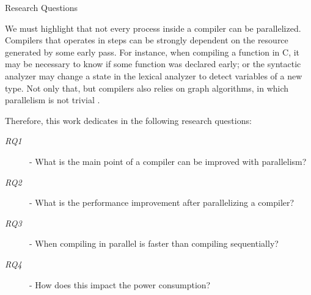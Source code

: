 \begin{section}{Research Questions}


We must highlight that not every process inside a compiler can be parallelized.
Compilers that operates in steps can be strongly dependent on the resource
generated by some early pass.  For instance, when compiling a function in C, it
may be necessary to know if some function was declared early; or the syntactic
analyzer may change a state in the lexical analyzer to detect variables of a
new type. Not only that, but compilers also relies on graph algorithms, in
which parallelism is not trivial \citep{lumsdaine2007challenges}.



Therefore, this work dedicates in the following research questions:

\begin{description}
    \item[\textit{RQ1}] - What is the main point of a compiler can be improved with parallelism?
    \item[\textit{RQ2}] - What is the performance improvement after parallelizing a compiler?
	\item[\textit{RQ3}] - When compiling in parallel is faster than compiling sequentially?
	\item[\textit{RQ4}] - How does this impact the power consumption?
\end{description}

%


\end{section}
